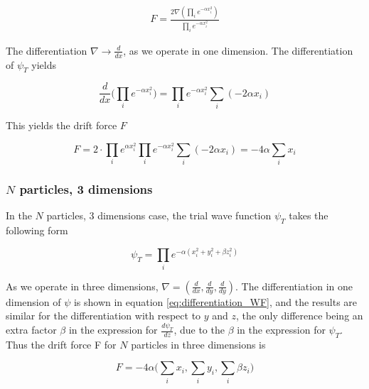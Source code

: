 \documentclass[norsk,a4paper,12pt]{article}
\begin{document}
\begin{align}
	F = \frac{2 \nabla ( \prod_i e^{-\alpha x_i^2} )}{ \prod_i e^{-\alpha x_i^2} }
\end{align}

The differentiation $\nabla \rightarrow \frac{d }{d x}$, as we operate in one dimension. The differentiation of $\psi_T$ yields

\begin{equation}
	\label{eq:differentiation_WF}
	\frac{d}{d x} \Big( \prod_i e^{-\alpha x_i^2}\Big) =  \prod_i e^{-\alpha x_i^2} \sum_i (-2\alpha x_i)
\end{equation}

This yields the drift force $F$

\begin{equation}
	F =  2\cdot \prod_i e^{\alpha x_i^2}   \prod_i e^{-\alpha x_i^2} \sum_i (-2\alpha x_i) = - 4 \alpha \sum_i x_i
\end{equation}

\subsubsection{$N$ particles, 3 dimensions}

In the $N$ particles, $3$ dimensions case, the trial wave function $\psi_T$ takes the following form

\begin{equation}
	\psi_T = \prod_i e^{- \alpha (x_i^2 + y_i^2 + \beta z_i^2)} 
\end{equation}

As we operate in three dimensions, $\nabla = (\frac{d}{dx}, \frac{d}{dy}, \frac{d}{dy})$. The differentiation in one dimension of $\psi$ is shown in equation \ref{eq:differentiation_WF}, and the results are similar for the differentiation with respect to $y$ and $z$, the only difference being an extra factor $\beta$ in the expression for $\frac{d \psi_T}{d z}$, due to the $\beta$ in the expression for $\psi_T$. Thus the drift force F for $N$ particles in three dimensions is 

\begin{equation}
	F = -4 \alpha \Big(\sum_i x_i, \sum_i y_i, \sum_i \beta z_i \Big)
\end{equation}
\end{document}
